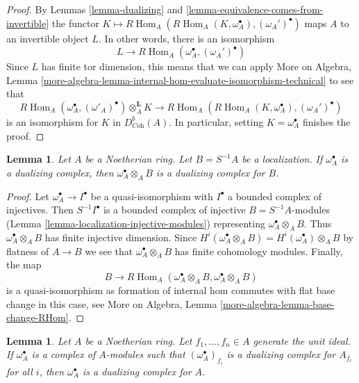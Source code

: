 \documentclass{stacks-project}
\theoremstyle{plain}
\newtheorem{lemma}[subsection]{Lemma}
\theoremstyle{definition}
\theoremstyle{remark}
\numberwithin{equation}{subsection}
\def\Hom{\mathop{\mathrm{Hom}}\nolimits}
\begin{document}
\begin{proof}
By Lemmas \ref{lemma-dualizing} and
\ref{lemma-equivalence-comes-from-invertible} the functor
$K \mapsto R\Hom_A(R\Hom_A(K, \omega_A^\bullet), (\omega_A')^\bullet)$
maps $A$ to an invertible object $L$. In other words, there is
an isomorphism
$$
L \longrightarrow R\Hom_A(\omega_A^\bullet, (\omega_A')^\bullet)
$$
Since $L$ has finite tor dimension, this means that we can apply
More on Algebra, Lemma
\ref{more-algebra-lemma-internal-hom-evaluate-isomorphism-technical}
to see that
$$
R\Hom_A(\omega_A^\bullet, (\omega'_A)^\bullet) \otimes_A^\mathbf{L} K
\longrightarrow
R\Hom_A(R\Hom_A(K, \omega_A^\bullet), (\omega_A')^\bullet)
$$
is an isomorphism for $K$ in $D^b_{\textit{Coh}}(A)$.
In particular, setting $K = \omega_A^\bullet$ finishes the proof.
\end{proof}

\begin{lemma}
\label{lemma-dualizing-localize}
Let $A$ be a Noetherian ring. Let $B = S^{-1}A$ be a localization.
If $\omega_A^\bullet$ is a dualizing
complex, then $\omega_A^\bullet \otimes_A B$ is a dualizing
complex for $B$.
\end{lemma}

\begin{proof}
Let $\omega_A^\bullet \to I^\bullet$ be a quasi-isomorphism
with $I^\bullet$ a bounded complex of injectives.
Then $S^{-1}I^\bullet$ is a bounded complex of injective
$B = S^{-1}A$-modules (Lemma \ref{lemma-localization-injective-modules})
representing $\omega_A^\bullet \otimes_A B$.
Thus $\omega_A^\bullet \otimes_A B$ has finite injective dimension.
Since $H^i(\omega_A^\bullet \otimes_A B) = H^i(\omega_A^\bullet) \otimes_A B$
by flatness of $A \to B$ we see that $\omega_A^\bullet \otimes_A B$
has finite cohomology modules. Finally, the map
$$
B \longrightarrow
R\Hom_A(\omega_A^\bullet \otimes_A B, \omega_A^\bullet \otimes_A B)
$$
is a quasi-isomorphism as formation of internal hom commutes with
flat base change in this case, see
More on Algebra, Lemma \ref{more-algebra-lemma-base-change-RHom}.
\end{proof}

\begin{lemma}
\label{lemma-dualizing-glue}
Let $A$ be a Noetherian ring. Let $f_1, \ldots, f_n \in A$
generate the unit ideal. If $\omega_A^\bullet$ is a complex
of $A$-modules such that $(\omega_A^\bullet)_{f_i}$ is a dualizing
complex for $A_{f_i}$ for all $i$, then $\omega_A^\bullet$ is a dualizing
complex for $A$.
\end{lemma}
\end{document}
